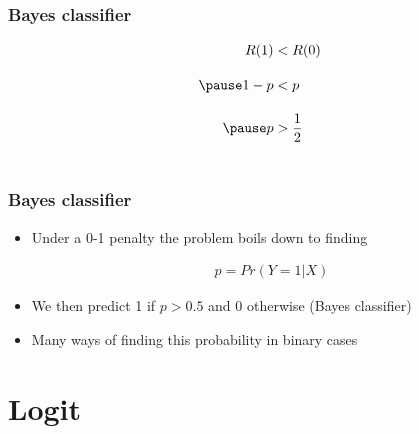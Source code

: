 \documentclass[
  shownotes,
  xcolor={svgnames},
  hyperref={colorlinks,citecolor=DarkBlue,linkcolor=andesred,urlcolor=DarkBlue}
  , aspectratio=169]{beamer}
\begin{document}
\begin{frame}[fragile]
\frametitle{Bayes classifier}

\begin{eqnarray}
R(1) &< R(0)  \\[10pt] \nonumber \pause
1-p &< p \\[10pt] \nonumber \pause
p &> \frac{1}{2} \\ \nonumber
\end{eqnarray}


\end{frame}
\begin{frame}[fragile]
\frametitle{Bayes classifier}

\begin{itemize}
  \item Under a 0-1 penalty the problem boils down to finding 

\begin{align}
p=Pr(Y=1|X)
\end{align}
  
  \medskip
  \item We then predict 1 if $p>0.5$ and 0 otherwise (Bayes classifier)
  \medskip
  \item Many ways of finding this probability in binary cases
\end{itemize}


\end{frame}
\section{Logit}
\end{document}
